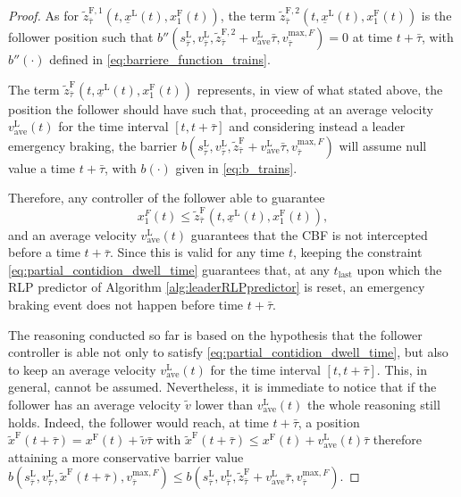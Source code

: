 \documentclass[letterpaper, 10 pt, conference]{ieeeconf}
\theoremstyle{definition}
\theoremstyle{nopoint}
\begin{document}
\begin{proof}
As for $\tilde{z}^{\mathrm{F},1}_{\bar{\tau}} (t,\underline{x}^\mathrm{L}(t),x_1^\mathrm{F}(t))$, the term $\tilde{z}^{\mathrm{F},2}_{\bar{\tau}} (t,\underline{x}^\mathrm{L}(t),x_1^\mathrm{F}(t))$ is the follower position such that $b''(s_{\bar{\tau}}^\mathrm{L},v_{\bar{\tau}}^\mathrm{L},\tilde{z}^{\mathrm{F},2}_{\bar{\tau}}+v_{\mathrm{ave}}^\mathrm{L}\bar{\tau},v_{\bar{\tau}}^{\mathrm{max}, F})=0$ at time $t+\bar{\tau}$, with $b''(\cdot)$ defined in \eqref{eq:barriere_function_trains}.

The term $\tilde{z}^{\mathrm{F}}_{\bar{\tau}} (t,\underline{x}^\mathrm{L}(t),x_1^\mathrm{F}(t))$ represents, in view of what stated above, the position the follower should have such that, proceeding at an average velocity $v_{\mathrm{ave}}^\mathrm{L}(t)$ for the time interval $[t, t+\bar{\tau}]$ and considering instead a leader emergency braking, the barrier $b(s_{\bar{\tau}}^\mathrm{L},v_{\bar{\tau}}^\mathrm{L},\tilde{z}^{\mathrm{F}}_{\bar{\tau}}+v_{\mathrm{ave}}^\mathrm{L}\bar{\tau},v_{\bar{\tau}}^{\mathrm{max}, F})$ will assume null value a time $t+\bar{\tau}$, with $b(\cdot)$ given in \eqref{eq:b_trains}.

Therefore, any controller of the follower able to guarantee
\begin{equation}\label{eq:partial_contidion_dwell_time}
x_1^F(t)\leq \tilde{z}^{\mathrm{F}}_{\bar{\tau}} (t,\underline{x}^\mathrm{L}(t),x_1^\mathrm{F}(t)), 
\end{equation}
and an average velocity $v_{\mathrm{ave}}^\mathrm{L}(t)$ guarantees that the CBF is not intercepted before a time $t+\bar{\tau}$. Since this is valid for any time $t$, keeping the constraint \eqref{eq:partial_contidion_dwell_time} guarantees that, at any $t_{\mathrm{last}}$ upon which the RLP predictor of Algorithm \ref{alg:leaderRLPpredictor} is reset, an emergency braking event does not happen before time $t+\bar{\tau}$. 

The reasoning conducted so far is based on the hypothesis that the follower controller is able not only to satisfy \eqref{eq:partial_contidion_dwell_time}, but also to keep an average velocity $v_{\mathrm{ave}}^\mathrm{L}(t)$ for the time interval $[t, t+\bar{\tau}]$. This, in general, cannot be assumed. Nevertheless, it is immediate to notice that if the follower has an average velocity $\tilde{v}$ lower than $v_{\mathrm{ave}}^\mathrm{L}(t)$  the whole reasoning still holds. Indeed, the follower would reach, at time $t+\bar{\tau}$, a position $\tilde{x}^\mathrm{F}(t+\bar{\tau})=x^{\mathrm{F}}(t)+\tilde{v}\bar{\tau}$ with $\tilde{x}^\mathrm{F}(t+\bar{\tau})\leq x^{\mathrm{F}}(t)+v_{\mathrm{ave}}^\mathrm{L}(t)\bar{\tau} $ therefore attaining a more conservative barrier value
$b(s_{\bar{\tau}}^\mathrm{L},v_{\bar{\tau}}^\mathrm{L},\tilde{x}^\mathrm{F}(t+\bar{\tau}),v_{\bar{\tau}}^{\mathrm{max}, F})\leq b(s_{\bar{\tau}}^\mathrm{L},v_{\bar{\tau}}^\mathrm{L},\tilde{z}^{\mathrm{F}}_{\bar{\tau}}+v_{\mathrm{ave}}^\mathrm{L}\bar{\tau} ,v_{\bar{\tau}}^{\mathrm{max}, F})$.


\end{proof}
\end{document}
